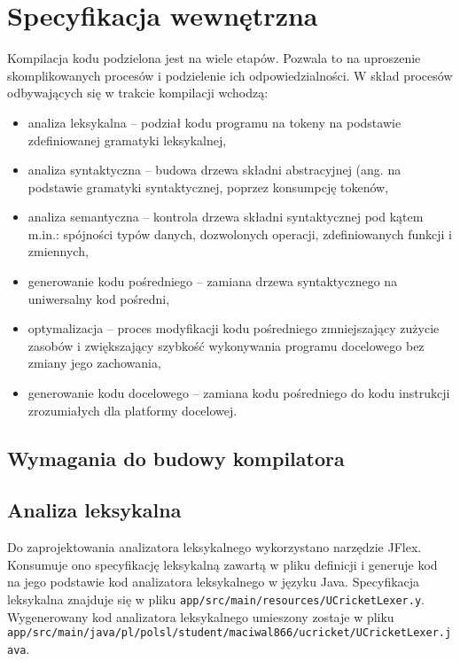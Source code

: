 \chapter{Specyfikacja wewnętrzna}
\label{ch:05}
Kompilacja kodu podzielona jest na wiele etapów. Pozwala to na uproszenie skomplikowanych procesów i podzielenie ich odpowiedzialności. W skład procesów odbywających się w trakcie kompilacji wchodzą:
\begin{itemize}
\item analiza leksykalna -- podział kodu programu na tokeny na podstawie zdefiniowanej gramatyki leksykalnej,
\item analiza syntaktyczna -- budowa drzewa składni abstracyjnej (ang.  na podstawie gramatyki syntaktycznej, poprzez konsumpcję tokenów,
\item analiza semantyczna -- kontrola drzewa składni syntaktycznej pod kątem m.in.: spójności typów danych, dozwolonych operacji, zdefiniowanych funkcji i zmiennych,
\item generowanie kodu pośredniego -- zamiana drzewa syntaktycznego na uniwersalny kod pośredni,
\item optymalizacja -- proces modyfikacji kodu pośredniego zmniejszający zużycie zasobów i zwiększający szybkość wykonywania programu docelowego bez zmiany jego zachowania,
\item generowanie kodu docelowego -- zamiana kodu pośredniego do kodu instrukcji zrozumiałych dla platformy docelowej.
\end{itemize}

\section{Wymagania do budowy kompilatora}

\section{Analiza leksykalna}
Do zaprojektowania analizatora leksykalnego wykorzystano narzędzie JFlex. Konsumuje ono specyfikację leksykalną zawartą w pliku definicji i generuje kod na jego podstawie kod analizatora leksykalnego w języku Java. Specyfikacja leksykalna znajduje się w pliku \lstinline|app/src/main/resources/UCricketLexer.y|. Wygenerowany kod analizatora leksykalnego umieszony zostaje w pliku \lstinline|app/src/main/java/pl/polsl/student/maciwal866/ucricket/UCricketLexer.java|.

